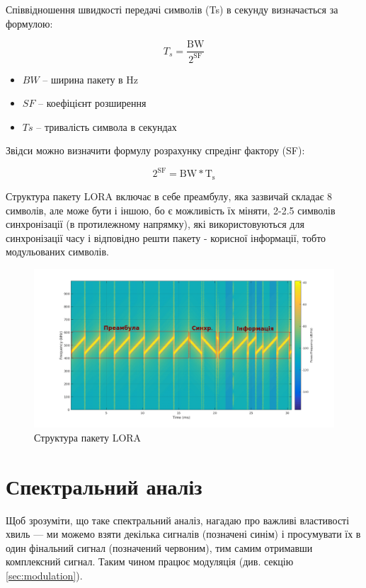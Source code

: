 \documentclass{article}
\begin{document}
Співвідношення швидкості передачі символів (Ts) в секунду визначається за формулою:

\[
T_s = \frac{\mathrm{BW}}{2^{\mathrm{SF}}}
\]

\begin{itemize}[noitemsep, topsep=8pt]
	\item ${BW}$ -- ширина пакету в Hz
	\item ${SF}$ -- коефіцієнт розширення  
	\item ${Ts}$ -- тривалість символа в секундах
\end{itemize}
Звідси можно визначити формулу розрахунку спредінг фактору (SF):

\[
{2^{\mathrm{SF}}} = {\mathrm{BW}}*{\mathrm{T_s}}
\]

Структура пакету LORA включає в себе преамбулу, яка зазвичай складає 8 символів, але може бути і іншою, бо є можливість їх міняти, 2-2.5 символів синхронізації (в протилежному напрямку), які використовуються для синхронізації часу і відповідно решти пакету - корисної інформації, тобто модульованих символів.

\begin{figure}[h!]
	\centering
	\includegraphics[width=0.8\linewidth]{images/lora_preambul.png}
	\caption{\label{fig:lora_preambul} Структура пакету LORA}
\end{figure}


\newpage
\section{Спектральний аналіз}

Щоб зрозуміти, що таке спектральний аналіз, нагадаю про важливі властивості хвиль --- ми можемо взяти декілька сигналів (позначені синім) і просумувати їх в один фінальний сигнал (позначений червоним), тим самим отримавши комплексний сигнал. Таким чином працює модуляція (див. секцію \ref{sec:modulation}).
\end{document}
